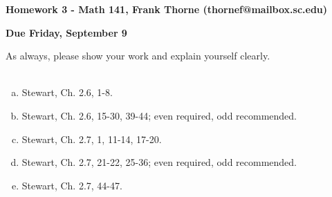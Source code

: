 \documentclass[12pt]{article}
\begin{document}
\setlength{\topmargin}{-2mm}





\begin{center}{\bf Homework 3 - Math 141, Frank Thorne (thornef@mailbox.sc.edu)}
\end{center}
\begin{center}
{\bf Due Friday, September 9}
\end{center}

As always, please show your work and explain yourself clearly. 
\\
\\
\begin{enumerate}[(a)]
\item
Stewart, Ch. 2.6, 1-8.

\item
Stewart, Ch. 2.6, 15-30, 39-44; even required, odd recommended.

\item
Stewart, Ch. 2.7, 1, 11-14, 17-20.

\item
Stewart, Ch. 2.7, 21-22, 25-36; even required, odd recommended.

\item
Stewart, Ch. 2.7, 44-47.

\end{enumerate}
\end{document}
